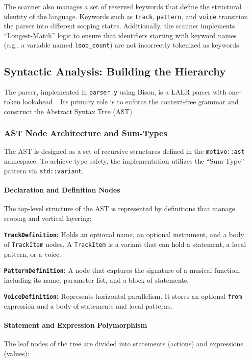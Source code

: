 The scanner also manages a set of reserved keywords that define the structural identity of the language.
Keywords such as \texttt{track}, \texttt{pattern}, and \texttt{voice} transition the parser into different scoping
states.
Additionally, the scanner implements ``Longest-Match'' logic to ensure that identifiers starting with keyword names
(e.g., a variable named \texttt{loop\_count}) are not incorrectly tokenized as keywords.

\subsection{Syntactic Analysis: Building the Hierarchy}\label{detail-subsec:syntactic-analysis:-building-the-hierarchy}

The parser, implemented in \texttt{parser.y} using Bison, is a LALR parser with one-token
lookahead~\cite{GNU_Bison_2026}.
Its primary role is to enforce the context-free grammar and construct the Abstract Syntax Tree (AST).

\subsubsection{AST Node Architecture and Sum-Types}

The AST is designed as a set of recursive structures defined in the \texttt{motivo::ast} namespace.
To achieve type safety, the implementation utilizes the ``Sum-Type'' pattern via
\texttt{std::variant}.

\paragraph{Declaration and Definition Nodes}
The top-level structure of the AST is represented by definitions that manage scoping and vertical layering:

\noindent \textbf{\texttt{TrackDefinition}:} Holds an optional name, an optional instrument, and a body of
\texttt{TrackItem} nodes.
A \texttt{TrackItem} is a variant that can hold a statement, a local pattern, or a voice.

\noindent \textbf{\texttt{PatternDefinition}:} A node that captures the signature of a musical function, including its
name, parameter list, and a block of statements.

\noindent \textbf{\texttt{VoiceDefinition}:} Represents horizontal parallelism.
It stores an optional \texttt{from} expression and a body of statements and local patterns.

\paragraph{Statement and Expression Polymorphism}
The leaf nodes of the tree are divided into statements (actions) and expressions (values):

